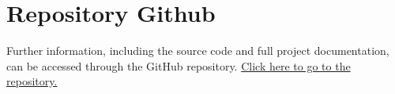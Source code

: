 \documentclass{llncs}
\begin{document}
\section{Repository Github}
Further information, including the source code and full project documentation, can be accessed through the GitHub repository.  \href{https://github.com/Diegodepab/Supervised_Learning_Model_Evaluation_Metrics}{Click here to go to the repository.} 



\end{document}
